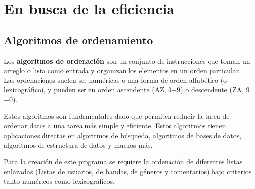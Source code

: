 \section{En busca de la eficiencia}
\subsection{Algoritmos de ordenamiento}
Los \textbf{algoritmos de ordenación} son un conjunto de instrucciones que toman un arreglo o lista como entrada y organizan los elementos en un orden particular.
Las ordenaciones suelen ser numéricas o una forma de orden alfabético (o lexicográfico), y pueden ser en orden ascendente (AZ, 0$-$9) o descendente (ZA, 9$-$0).

Estos algoritmos son fundamentales dado que permiten reducir la tarea de ordenar datos a una tarea más simple y eficiente. Estos algoritmos tienen aplicaciones directas en algoritmos de búsqueda, algoritmos de bases de datos, algoritmos de estructura de datos y muchos más.

Para la creación de este programa se requiere la ordenación de diferentes listas enlazadas (Listas de usuarios, de bandas, de géneros y comentarios) bajo criterios tanto numéricos como lexicográficos.


